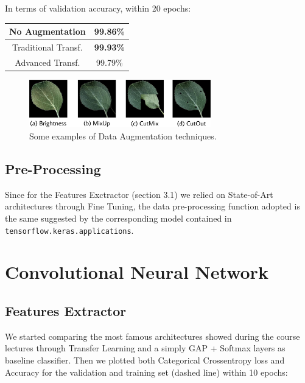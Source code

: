 \documentclass[conference,compsoc]{IEEEtran}
\begin{document}
In terms of validation accuracy, within 20 epochs:

\begin{center}
\begin{tabular}{ c c }
\hline\hline
 No Augmentation & 99.86\% \\ 
\hline
 Traditional Transf. & \textbf{99.93\%}  \\  
 Advanced Transf. & 99.79\% \\
\hline\hline
\end{tabular}
\end{center}

\begin{figure}[h!]
\centering
\includegraphics[width=3.1in]{img/leaves.jpg}
\caption{Some examples of Data Augmentation techniques.}
\label{fig_sim}
\end{figure}

\subsection{Pre-Processing}
Since for the Features Exctractor (section 3.1) we relied on State-of-Art architectures through Fine Tuning, the data pre-processing function adopted is the same suggested by the corresponding model contained in \texttt{tensorflow.keras.applications}.

\section{Convolutional Neural Network}
\subsection{Features Extractor}
We started comparing the most famous architectures showed during the course lectures through Transfer Learning and a simply GAP + Softmax layers as baseline classifier. Then we plotted both Categorical Crossentropy loss and Accuracy for the validation and training set (dashed line) within 10 epochs:
\end{document}
